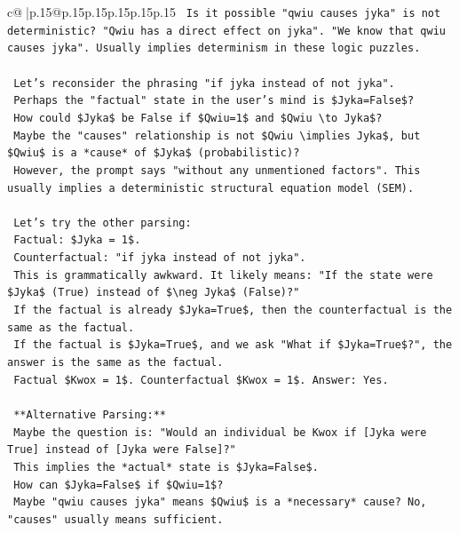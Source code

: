 \documentclass{article}
\begin{document}
{\begin{supertabular}{c@{$\;$}|p{.15\linewidth}@{}p{.15\linewidth}p{.15\linewidth}p{.15\linewidth}p{.15\linewidth}p{.15\linewidth}}
{{{\texttt{    Is it possible "qwiu causes jyka" is not deterministic? "Qwiu has a direct effect on jyka". "We know that qwiu causes jyka". Usually implies determinism in these logic puzzles.} \\
\\ 
\texttt{    Let's reconsider the phrasing "if jyka instead of not jyka".} \\
\texttt{    Perhaps the "factual" state in the user's mind is \$Jyka=False\$?} \\
\texttt{    How could \$Jyka\$ be False if \$Qwiu=1\$ and \$Qwiu \textbackslash{}to Jyka\$?} \\
\texttt{    Maybe the "causes" relationship is not \$Qwiu \textbackslash{}implies Jyka\$, but \$Qwiu\$ is a *cause* of \$Jyka\$ (probabilistic)?} \\
\texttt{    However, the prompt says "without any unmentioned factors". This usually implies a deterministic structural equation model (SEM).} \\
\\ 
\texttt{    Let's try the other parsing:} \\
\texttt{    Factual: \$Jyka = 1\$.} \\
\texttt{    Counterfactual: "if jyka instead of not jyka".} \\
\texttt{    This is grammatically awkward. It likely means: "If the state were \$Jyka\$ (True) instead of \$\textbackslash{}neg Jyka\$ (False)?"} \\
\texttt{    If the factual is already \$Jyka=True\$, then the counterfactual is the same as the factual.} \\
\texttt{    If the factual is \$Jyka=True\$, and we ask "What if \$Jyka=True\$?", the answer is the same as the factual.} \\
\texttt{    Factual \$Kwox = 1\$. Counterfactual \$Kwox = 1\$. Answer: Yes.} \\
\\ 
\texttt{    **Alternative Parsing:**} \\
\texttt{    Maybe the question is: "Would an individual be Kwox if {[}Jyka were True{]} instead of {[}Jyka were False{]}?"} \\
\texttt{    This implies the *actual* state is \$Jyka=False\$.} \\
\texttt{    How can \$Jyka=False\$ if \$Qwiu=1\$?} \\
\texttt{    Maybe "qwiu causes jyka" means \$Qwiu\$ is a *necessary* cause? No, "causes" usually means sufficient.} \\
}}}
\end{supertabular}}
\end{document}
